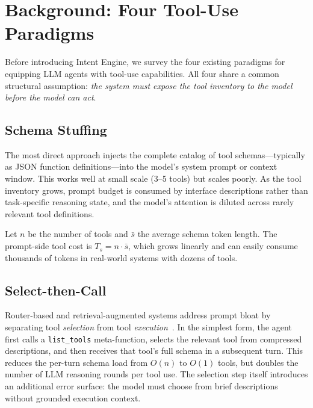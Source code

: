 \documentclass[11pt]{article}
\begin{document}
\section{Background: Four Tool-Use Paradigms}
\label{sec:background}

Before introducing Intent Engine, we survey the four existing paradigms for equipping LLM agents with tool-use capabilities.
All four share a common structural assumption: \emph{the system must expose the tool inventory to the model before the model can act}.

\subsection{Schema Stuffing}
\label{sec:schema-stuffing}

The most direct approach injects the complete catalog of tool schemas---typically as JSON function definitions---into the model's system prompt or context window.
This works well at small scale (3--5 tools) but scales poorly.
As the tool inventory grows, prompt budget is consumed by interface descriptions rather than task-specific reasoning state, and the model's attention is diluted across rarely relevant tool definitions.

Let $n$ be the number of tools and $\bar{s}$ the average schema token length.
The prompt-side tool cost is $T_s = n \cdot \bar{s}$, which grows linearly and can easily consume thousands of tokens in real-world systems with dozens of tools.

\subsection{Select-then-Call}
\label{sec:select-then-call}

Router-based and retrieval-augmented systems address prompt bloat by separating tool \emph{selection} from tool \emph{execution}~\citep{toolformer2023,gorilla2023}.
In the simplest form, the agent first calls a \texttt{list\_tools} meta-function, selects the relevant tool from compressed descriptions, and then receives that tool's full schema in a subsequent turn.
This reduces the per-turn schema load from $O(n)$ to $O(1)$ tools, but doubles the number of LLM reasoning rounds per tool use.
The selection step itself introduces an additional error surface: the model must choose from brief descriptions without grounded execution context.
\end{document}
